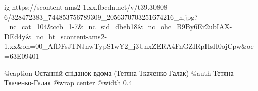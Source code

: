 
 
 
 
 









\clearpage
{}

\ifcmt
  ig https://scontent-ams2-1.xx.fbcdn.net/v/t39.30808-6/328472383_744853756789309_2056370703251674216_n.jpg?_nc_cat=104&ccb=1-7&_nc_sid=dbeb18&_nc_ohc=B9By6Er2ubIAX-DEd4y&_nc_ht=scontent-ams2-1.xx&oh=00_AfDFsJTNJnwTypS1wY2_j3UnxZERA4FnGZIRpHsH0ojCpw&oe=63E09401
 
  @caption Останній сніданок вдома (Тетяна Ткаченко-Галак)
  @auth Тетяна Ткаченко-Галак
  @wrap center
  @width 0.4
\fi

